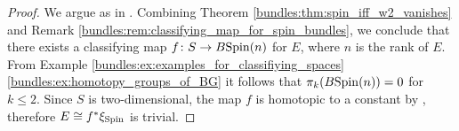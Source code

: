 \begin{proof}
    We argue as in \cite[Proof of Prop. 2.6 (i)]{Frenck2026Doubling}. Combining Theorem \ref{bundles:thm:spin_iff_w2_vanishes} and Remark \ref{bundles:rem:classifying_map_for_spin_bundles}, we conclude that there exists a classifying map $f \colon S \to B\mathrm{Spin}(n)$ for $E$, where $n$ is the rank of $E$. From Example \ref{bundles:ex:examples_for_classifiying_spaces} \ref{bundles:ex:homotopy_groups_of_BG} it follows that $\pi_k(B\mathrm{Spin}(n)) = 0$ for $k \leq 2$. Since $S$ is two-dimensional, the map $f$ is homotopic to a constant by \cite[Lem. 4.6]{Hatcher2002AlgebraicTopology}, therefore $E \cong f^\ast \xi_{\mathrm{Spin}}$ is trivial.
\end{proof}